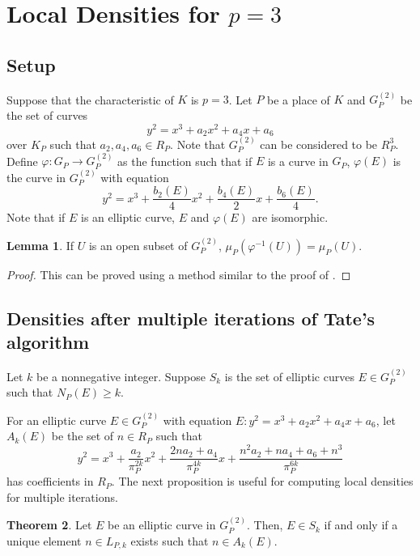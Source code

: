 \documentclass[12pt,letterpaper]{amsart}
\theoremstyle{definition}
\newtheorem{theorem}{Theorem}[section]
\newtheorem{lemma}[theorem]{Lemma}
\begin{document}
\section{Local Densities for \texorpdfstring{$p=3$}{}}
\label{sec:localb}

\subsection{Setup}

Suppose that the characteristic of $K$ is $p=3$. Let $P$ be a place of $K$ and $G_P^{(2)}$ be the set of curves
\[
y^2=x^3+a_2x^2+a_4x+a_6
\]
over $K_P$ such that $a_2, a_4, a_6\in R_P$. Note that $G_P^{(2)}$ can be considered to be $R_P^3$. Define $\varphi: G_P\rightarrow G_P^{(2)}$ as the function such that if $E$ is a curve in $G_P$, $\varphi(E)$ is the curve in $G_P^{(2)}$ with equation
\[
y^2=x^3+\frac{b_2(E)}{4}x^2+\frac{b_4(E)}{2}x+\frac{b_6(E)}{4}.
\]
Note that if $E$ is an elliptic curve, $E$ and $\varphi(E)$ are isomorphic.

\begin{lemma}
\label{invdensity2} If $U$ is an open subset of $G_P^{(2)}$, $\mu_P(\varphi^{-1}(U))=\mu_P(U)$.
\end{lemma}
\begin{proof}
This can be proved using a method similar to the proof of .
\end{proof}

\subsection{Densities after multiple iterations of Tate's algorithm}

Let $k$ be a nonnegative integer. Suppose $S_k$ is the set of elliptic curves $E\in G_P^{(2)}$ such that $N_P(E)\geq k$.

For an elliptic curve $E\in G_P^{(2)}$ with equation $E: y^2=x^3+a_2x^2+a_4x+a_6$, let $A_k(E)$ be the set of $n\in R_P$ such that
\[
y^2=x^3+\frac{a_2}{\pi_P^{2k}}x^2+\frac{2na_2+a_4}{\pi_P^{4k}}x+\frac{n^2a_2+na_4+a_6+n^3}{\pi_P^{6k}}
\]
has coefficients in $R_P$. The next proposition is useful for computing local densities for multiple iterations.

\begin{theorem}
\label{prop:unique1}
Let $E$ be an elliptic curve in $G_P^{(2)}$. Then, $E\in S_k$ if and only if a unique element $n\in L_{P,k}$ exists such that $n\in A_k(E)$.
\end{theorem}
\end{document}
